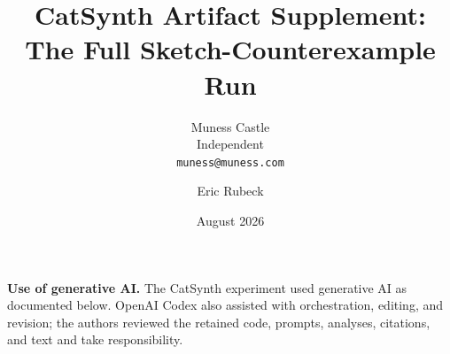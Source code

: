 \documentclass[11pt]{article}
\title{CatSynth Artifact Supplement:\\The Full Sketch-Counterexample Run}
\author{Muness Castle\\{\small Independent}\\{\small\texttt{muness@muness.com}} \and Eric Rubeck}
\date{August 2026}
\begin{document}
\maketitle
\paperlicense
\begin{center}
\small
\textbf{Use of generative AI.} The CatSynth experiment used generative AI as documented below.
OpenAI Codex also assisted with orchestration, editing, and revision; the authors reviewed the
retained code, prompts, analyses, citations, and text and take responsibility.
\end{center}

\end{document}
